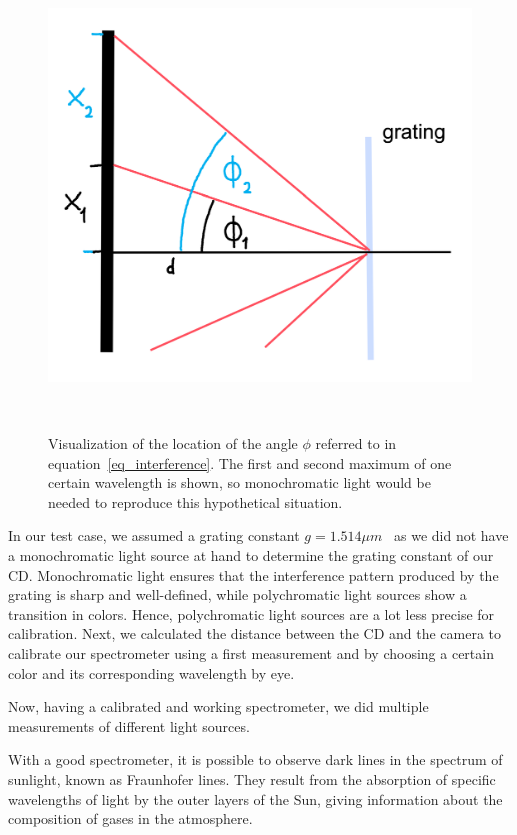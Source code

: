     \begin{figure}[H]
        \centering
        \includegraphics[scale = 0.6]{src/images/angle_phi.png}
        \caption{Visualization of the location of the angle $\phi$ referred to in equation~\eqref{eq_interference}.
        The first and second maximum of one certain wavelength is shown, so monochromatic light would be needed to reproduce this hypothetical situation.}~\label{fig_phi}
    \end{figure}

    In our test case, we assumed a grating constant $g = 1.514 \mu m$~\cite{src_grating_constant} as we did not have a monochromatic light source at hand to determine the grating constant of our CD.\@
    Monochromatic light ensures that the interference pattern produced by the grating is sharp and well-defined, while polychromatic light sources show a transition in colors.
    Hence, polychromatic light sources are a lot less precise for calibration.
    Next, we calculated the distance between the CD and the camera to calibrate our spectrometer using a first measurement and by choosing a certain color and its corresponding wavelength by eye.

    Now, having a calibrated and working spectrometer, we did multiple measurements of different light sources.

    With a good spectrometer, it is possible to observe dark lines in the spectrum of sunlight, known as Fraunhofer lines.
    They result from the absorption of specific wavelengths of light by the outer layers of the Sun, giving information about the composition of gases in the atmosphere.

